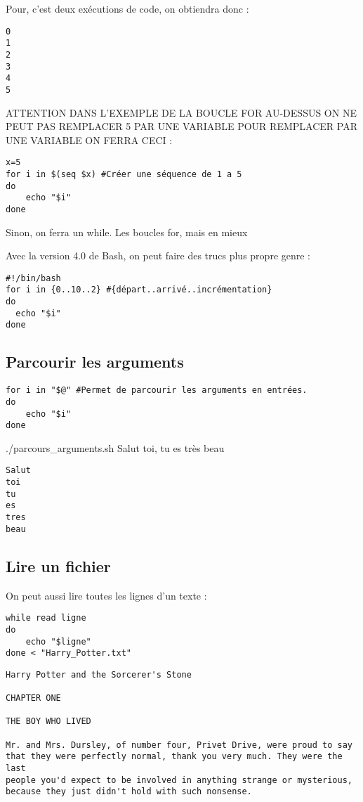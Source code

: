 \documentclass{article}
\begin{document}
Pour, c'est deux exécutions de code, on obtiendra donc :

\begin{lstlisting}
0
1
2
3
4
5
\end{lstlisting}

ATTENTION DANS L'EXEMPLE DE LA BOUCLE FOR AU-DESSUS ON NE PEUT PAS REMPLACER 5 PAR UNE VARIABLE POUR REMPLACER PAR UNE VARIABLE ON FERRA CECI :

\begin{verbatim}
x=5
for i in $(seq $x) #Créer une séquence de 1 a 5
do
    echo "$i"
done
\end{verbatim}

Sinon, on ferra un while.
Les boucles for, mais en mieux

Avec la version 4.0 de Bash, on peut faire des trucs plus propre genre :

\begin{verbatim}
#!/bin/bash
for i in {0..10..2} #{départ..arrivé..incrémentation}
do
  echo "$i"
done
\end{verbatim}

\subsection{Parcourir les arguments}

\begin{verbatim}
for i in "$@" #Permet de parcourir les arguments en entrées.
do
    echo "$i"
done
\end{verbatim}

./parcours\_arguments.sh Salut toi, tu es très beau

\begin{lstlisting}
Salut
toi
tu
es
tres
beau
\end{lstlisting}

\subsection{Lire un fichier}

On peut aussi lire toutes les lignes d'un texte :

\begin{verbatim}
while read ligne
do
    echo "$ligne"
done < "Harry_Potter.txt"
\end{verbatim}

\begin{lstlisting}
Harry Potter and the Sorcerer's Stone

CHAPTER ONE

THE BOY WHO LIVED

Mr. and Mrs. Dursley, of number four, Privet Drive, were proud to say
that they were perfectly normal, thank you very much. They were the last
people you'd expect to be involved in anything strange or mysterious,
because they just didn't hold with such nonsense.
\end{lstlisting}
\end{document}
